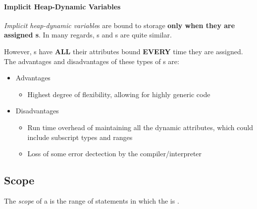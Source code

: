 \paragraph{Implicit Heap-Dynamic Variables}\label{par:Implicit_Heap-Dynamic_Variable_Binding_Lifetime}
\begin{definition}\label{def:Implicit_Heap-Dynamic_Variable_Binding_Lifetime}
  \emph{Implicit heap-dynamic variable}s are bound to  storage \textbf{only when they are assigned s}.
  In many regards, s and s are quite similar.

  However, s have \textbf{ALL} their attributes bound \textbf{EVERY} time they are assigned.
  The advantages and disadvantages of these types of s are:
  \begin{itemize}[noitemsep]
  \item Advantages
    \begin{itemize}[noitemsep]
    \item Highest degree of flexibility, allowing for highly generic code
    \end{itemize}
  \item Disadvantages
    \begin{itemize}[noitemsep]
    \item Run time overhead of maintaining all the dynamic attributes, which could include subscript types and ranges
    \item Loss of some error dectection by the compiler/interpreter
    \end{itemize}
  \end{itemize}
\end{definition}

\subsection{Scope}\label{subsec:Variable_Scope}
\begin{definition}[Scope]\label{def:Variable_Scope}
  The \emph{scope} of a  is the range of statements in which the  is .
\end{definition}

